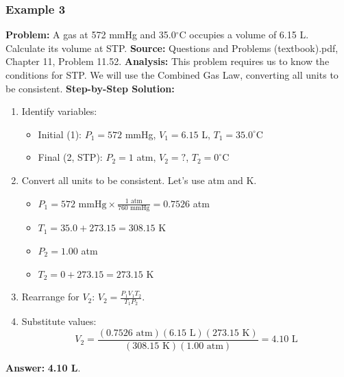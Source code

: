 \documentclass{article}
\begin{document}
\subsubsection{Example 3}
\textbf{Problem:} A gas at 572 mmHg and 35.0$^\circ$C occupies a volume of 6.15 L. Calculate its volume at STP.
\textbf{Source:} Questions and Problems (textbook).pdf, Chapter 11, Problem 11.52.
\textbf{Analysis:} This problem requires us to know the conditions for STP. We will use the Combined Gas Law, converting all units to be consistent.
\textbf{Step-by-Step Solution:}
\begin{enumerate}
    \item Identify variables:
    \begin{itemize}
        \item Initial (1): $P_1 = 572$ mmHg, $V_1 = 6.15$ L, $T_1 = 35.0^\circ$C
        \item Final (2, STP): $P_2 = 1$ atm, $V_2 = ?$, $T_2 = 0^\circ$C
    \end{itemize}
    \item Convert all units to be consistent. Let's use atm and K.
    \begin{itemize}
        \item $P_1 = 572 \text{ mmHg} \times \frac{1 \text{ atm}}{760 \text{ mmHg}} = 0.7526$ atm
        \item $T_1 = 35.0 + 273.15 = 308.15$ K
        \item $P_2 = 1.00$ atm
        \item $T_2 = 0 + 273.15 = 273.15$ K
    \end{itemize}
    \item Rearrange for $V_2$: $V_2 = \frac{P_1 V_1 T_2}{T_1 P_2}$.
    \item Substitute values:
    \[ V_2 = \frac{(0.7526 \text{ atm})(6.15 \text{ L})(273.15 \text{ K})}{(308.15 \text{ K})(1.00 \text{ atm})} = 4.10 \text{ L} \]
\end{enumerate}
\textbf{Answer:} \textbf{4.10 L}.
\end{document}
